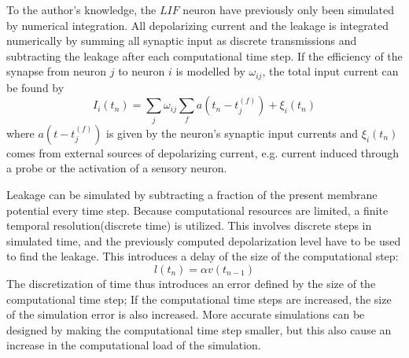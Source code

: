	To the author's knowledge, the $LIF$ neuron have previously only been simulated by numerical integration.
	All depolarizing current and the leakage is integrated numerically by summing all synaptic input as discrete transmissions and subtracting the leakage after each computational time step.
	If the efficiency of the synapse from neuron $j$ to neuron $i$ is modelled by $\omega_{ij}$, the total input current can be found by 
\begin{equation}
	I_i(t_n) = \sum_j \omega_{ij} \sum_f a(t_n - t_j^{(f)}) + \xi_i(t_n)
\end{equation}
	where $a(t- t_j^{(f)})$ is given by the neuron's synaptic input currents and $\xi_i(t_n)$ comes from external sources of depolarizing current, e.g. current induced through a probe or the activation of a sensory neuron\cite{florian03}.

	Leakage can be simulated by subtracting a fraction of the present membrane potential every time step.
	Because computational resources are limited, a finite temporal resolution(discrete time) is utilized.
	This involves discrete steps in simulated time, and the previously computed depolarization level have to be used to find the leakage.
	This introduces a delay of the size of the computational step:
\begin{equation}
	l(t_n) = \alpha v(t_{n-1})
\end{equation}
	The discretization of time thus introduces an error defined by the size of the computational time step;
		If the computational time steps are increased, the size of the simulation error is also increased.
	More accurate simulations can be designed by making the computational time step smaller, but this also cause an increase in the computational load of the simulation. %
	
